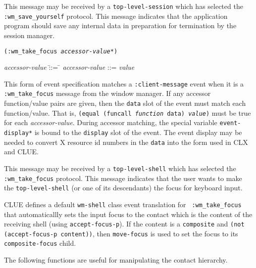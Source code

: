 \documentclass[twoside]{book}
\begin{document}
\begin{sloppy}
\begin{flushright}
\parbox[t]{5.75in}{
This message may be received by a {\tt top-level-session} which has selected the 
{\tt :wm\_save\_yourself} protocol. This message indicates that the application
program should save any internal data in preparation for termination by the
session manager.}
\end{flushright}


{\samepage
{}
{\tt (:wm\_take\_focus {\em accessor-value}*)}\\
\hspace*{.75in}
\parbox[t]{5.75in}{
\begin{tabbing}
{\em accessor-value} \= ::= \= \kill
{\em accessor-value} \>::=  {\em value} \\
\end{tabbing}}
}
\begin{flushright}
\parbox[t]{5.75in}{
This
form of event specification matches a {\tt :client-message}
event when it is a {\tt :wm\_take\_focus} message from the window manager.
If
any accessor function/value pairs are
given, then the {\tt data} slot of the event must
match each function/value. That is, {\tt (equal (funcall {\em function}
data) {\em value})} must be true for each {\em accessor-value}.
During accessor matching, the special variable {\tt *event-display*} is
bound to the {\tt display} slot of the event. The event display may be
needed to convert X resource id numbers in the {\tt data} into the form
used in CLX and CLUE.}

\parbox[t]{5.75in}{
This message may be received by a {\tt top-level-shell} which has selected the 
{\tt :wm\_take\_focus} protocol. This message indicates that the user wants to make
the {\tt top-level-shell} (or one of its descendants) the focus for keyboard input.}

\parbox[t]{5.75in}{
CLUE defines a default {\tt wm-shell} class event translation for {\tt
:wm\_take\_focus} that automaticallly sets the input focus to the contact which
is the content of the receiving shell
(using {\tt accept-focus-p}).
If the content is a {\tt composite} and {\tt (not (accept-focus-p content))},
then {\tt move-focus} is used to set the focus to its
{\tt composite-focus} child.
}\end{flushright}


The following functions are useful for manipulating the contact
hierarchy.


\end{sloppy}
\end{document}
